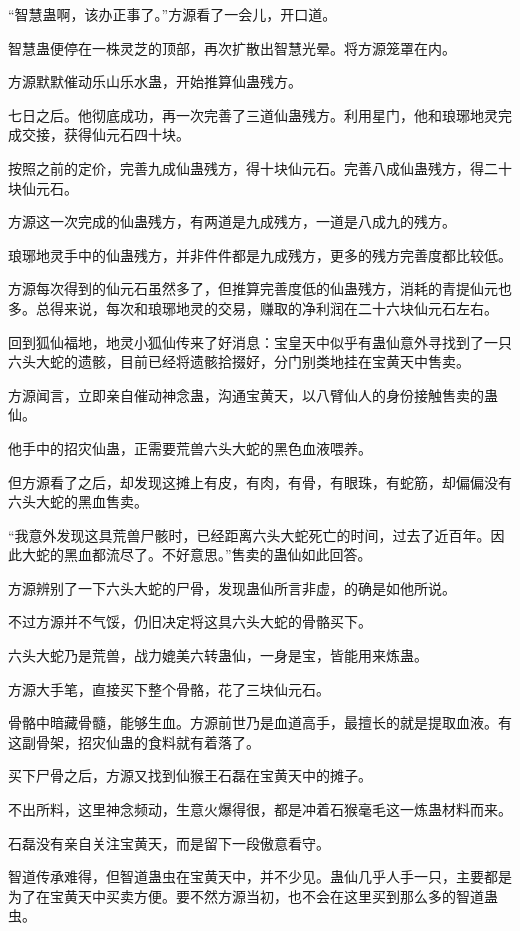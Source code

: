 \begin{this_body}
“智慧蛊啊，该办正事了。”方源看了一会儿，开口道。

智慧蛊便停在一株灵芝的顶部，再次扩散出智慧光晕。将方源笼罩在内。

方源默默催动乐山乐水蛊，开始推算仙蛊残方。

七日之后。他彻底成功，再一次完善了三道仙蛊残方。利用星门，他和琅琊地灵完成交接，获得仙元石四十块。

按照之前的定价，完善九成仙蛊残方，得十块仙元石。完善八成仙蛊残方，得二十块仙元石。

方源这一次完成的仙蛊残方，有两道是九成残方，一道是八成九的残方。

琅琊地灵手中的仙蛊残方，并非件件都是九成残方，更多的残方完善度都比较低。

方源每次得到的仙元石虽然多了，但推算完善度低的仙蛊残方，消耗的青提仙元也多。总得来说，每次和琅琊地灵的交易，赚取的净利润在二十六块仙元石左右。

回到狐仙福地，地灵小狐仙传来了好消息：宝皇天中似乎有蛊仙意外寻找到了一只六头大蛇的遗骸，目前已经将遗骸拾掇好，分门别类地挂在宝黄天中售卖。

方源闻言，立即亲自催动神念蛊，沟通宝黄天，以八臂仙人的身份接触售卖的蛊仙。

他手中的招灾仙蛊，正需要荒兽六头大蛇的黑色血液喂养。

但方源看了之后，却发现这摊上有皮，有肉，有骨，有眼珠，有蛇筋，却偏偏没有六头大蛇的黑血售卖。

“我意外发现这具荒兽尸骸时，已经距离六头大蛇死亡的时间，过去了近百年。因此大蛇的黑血都流尽了。不好意思。”售卖的蛊仙如此回答。

方源辨别了一下六头大蛇的尸骨，发现蛊仙所言非虚，的确是如他所说。

不过方源并不气馁，仍旧决定将这具六头大蛇的骨骼买下。

六头大蛇乃是荒兽，战力媲美六转蛊仙，一身是宝，皆能用来炼蛊。

方源大手笔，直接买下整个骨骼，花了三块仙元石。

骨骼中暗藏骨髓，能够生血。方源前世乃是血道高手，最擅长的就是提取血液。有这副骨架，招灾仙蛊的食料就有着落了。

买下尸骨之后，方源又找到仙猴王石磊在宝黄天中的摊子。

不出所料，这里神念频动，生意火爆得很，都是冲着石猴毫毛这一炼蛊材料而来。

石磊没有亲自关注宝黄天，而是留下一段傲意看守。

智道传承难得，但智道蛊虫在宝黄天中，并不少见。蛊仙几乎人手一只，主要都是为了在宝黄天中买卖方便。要不然方源当初，也不会在这里买到那么多的智道蛊虫。


\end{this_body}

